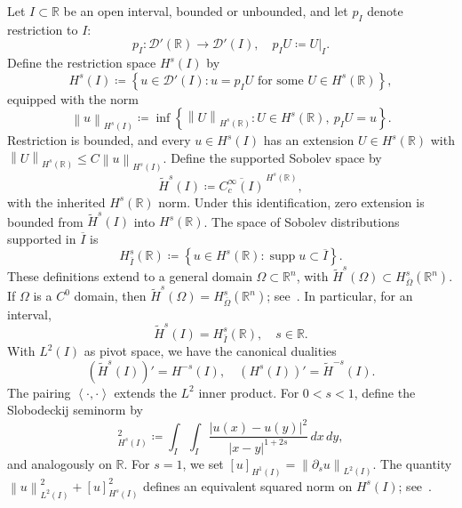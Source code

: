 \documentclass[11pt,reqno]{amsart}
\theoremstyle{plain}
\theoremstyle{definition}
\numberwithin{equation}{section}
\newcommand{\paren}[1]{\left(#1\right)}
\newcommand{\p}{\partial}
\newcommand{\wt}[1]{\widetilde{#1}}
\newcommand{\abs}[1]{\left\lvert #1 \right\rvert}
\newcommand{\norm}[1]{\left\lVert #1 \right\rVert}
\newcommand{\dual}[2]{\left\langle #1,#2 \right\rangle}
\newcommand{\R}{\mathbb{R}}
\begin{document}
Let $I\subset\R$ be an open interval, bounded or unbounded, and let $p_I$
denote restriction to $I$:
\begin{equation}
    p_I:\mathcal D'(\R)\longrightarrow\mathcal D'(I),
    \quad p_IU\coloneqq U|_I.
\end{equation}
Define the restriction space $H^s(I)$ by
\begin{equation}
    H^s(I)
    \coloneqq
    \left\{u\in\mathcal D'(I):
    u=p_IU\text{ for some }U\in H^s(\R)\right\},
\end{equation}
equipped with the norm
\begin{equation}
    \norm{u}_{H^s(I)}
    \coloneqq
    \inf\left\{\norm{U}_{H^s(\R)}:
    U\in H^s(\R),\ p_IU=u\right\}.
\end{equation}
Restriction is bounded, and every $u\in H^s(I)$ has an extension
$U\in H^s(\R)$ with $\norm{U}_{H^s(\R)}\le C\norm{u}_{H^s(I)}$.
Define the supported Sobolev space by
\begin{equation}\label{eqn:supported-space-definition}
    \wt H^s(I)
    \coloneqq
    \overline{C_c^\infty(I)}^{\,H^s(\R)},
\end{equation}
with the inherited $H^s(\R)$ norm.
Under this identification, zero extension is bounded from
$\wt H^s(I)$ into $H^s(\R)$.
The space of Sobolev distributions supported in $\overline I$ is
\begin{equation}
    H^s_{\overline I}(\R)
    \coloneqq
    \left\{u\in H^s(\R):\operatorname{supp}u\subset\overline I\right\}.
\end{equation}
These definitions extend to a general domain $\Omega \subset \R^n$, with
$\wt H^s(\Omega)\subset H^s_{\overline \Omega}(\R^n)$.
If $\Omega$ is a $C^0$ domain, then
$\wt H^s(\Omega)= H^s_{\overline \Omega}(\R^n)$;
see~\cite[Chapter~3]{McLean2000}.
In particular, for an interval,
\begin{equation}
    \wt H^s(I)=H^s_{\overline I}(\R),\quad s\in\R.
\end{equation}
With $L^2(I)$ as pivot space, we have the canonical dualities
\begin{equation}
    \paren{\wt H^s(I)}'=H^{-s}(I),
    \quad
    \paren{H^s(I)}'=\wt H^{-s}(I).
\end{equation}
The pairing $\dual{\cdot}{\cdot}$ extends the $L^2$ inner product.
For $0<s<1$, define the Slobodeckij seminorm by
\begin{equation}
    [u]_{H^s(I)}^2
    \coloneqq
    \int_I\int_I
    \frac{\abs{u(x)-u(y)}^2}{\abs{x-y}^{1+2s}}\,dx\,dy,
\end{equation}
and analogously on $\R$. For $s=1$, we set
$[u]_{H^1(I)}=\norm{\p_su}_{L^2(I)}$.
The quantity $\norm{u}_{L^2(I)}^2+[u]_{H^s(I)}^2$ defines an equivalent squared norm on
$H^s(I)$; see~\cite[Chapter~3]{McLean2000}.
\end{document}
